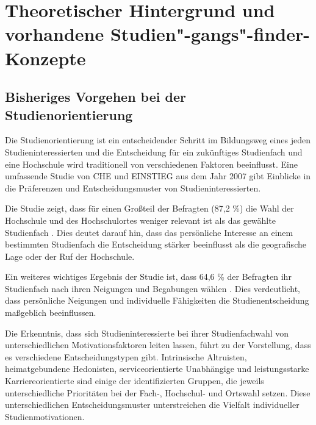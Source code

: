\section{Theoretischer Hintergrund und vorhandene Studien"-gangs"-finder-Konzepte}
\subsection{Bisheriges Vorgehen bei der Studienorientierung}


Die Studienorientierung ist ein entscheidender Schritt im Bildungsweg eines
jeden Studieninteressierten und die Entscheidung für ein zukünftiges Studienfach
und eine Hochschule wird traditionell von verschiedenen Faktoren beeinflusst.
Eine umfassende Studie von CHE und EINSTIEG aus dem Jahr 2007 gibt Einblicke in
die Präferenzen und Entscheidungsmuster von Studieninteressierten.

Die Studie zeigt, dass für einen Großteil der Befragten (87,2 \%) die Wahl der
Hochschule und des Hochschulortes weniger relevant ist als das gewählte
Studienfach \parencite{hachmeister_einflussfaktoren_2023}. Dies deutet darauf hin, dass das
persönliche Interesse an einem bestimmten Studienfach die Entscheidung stärker
beeinflusst als die geografische Lage oder der Ruf der Hochschule.

Ein weiteres wichtiges Ergebnis der Studie ist, dass 64,6 \% der Befragten ihr
Studienfach nach ihren Neigungen und Begabungen wählen
\parencite{hachmeister_einflussfaktoren_2023}. Dies verdeutlicht, dass persönliche Neigungen und
individuelle Fähigkeiten die Studienentscheidung maßgeblich beeinflussen.

Die Erkenntnis, dass sich Studieninteressierte bei ihrer Studienfachwahl von
unterschiedlichen Motivationsfaktoren leiten lassen, führt zu der Vorstellung,
dass es verschiedene Entscheidungstypen gibt. Intrinsische Altruisten,
heimatgebundene Hedonisten, serviceorientierte Unabhängige und leistungsstarke
Karriereorientierte sind einige der identifizierten Gruppen, die jeweils
unterschiedliche Prioritäten bei der Fach-, Hochschul- und Ortswahl setzen.
Diese unterschiedlichen Entscheidungsmuster unterstreichen die Vielfalt
individueller Studienmotivationen. \parencite{hachmeister_einflussfaktoren_2023}

